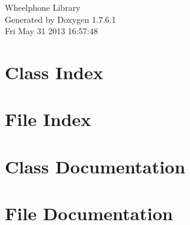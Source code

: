 \documentclass[a4paper]{book}
\begin{document}
\begin{titlepage}
\vspace*{7cm}
\begin{center}
{\Large \-Wheelphone \-Library }\\
\vspace*{1cm}
{\large \-Generated by Doxygen 1.7.6.1}\\
\vspace*{0.5cm}
{\small Fri May 31 2013 16:57:48}\\
\end{center}
\end{titlepage}
\clearemptydoublepage
{}
\tableofcontents
\clearemptydoublepage
{}
\chapter{\-Class \-Index}

\chapter{\-File \-Index}

\chapter{\-Class \-Documentation}






\chapter{\-File \-Documentation}

\printindex
\end{document}
